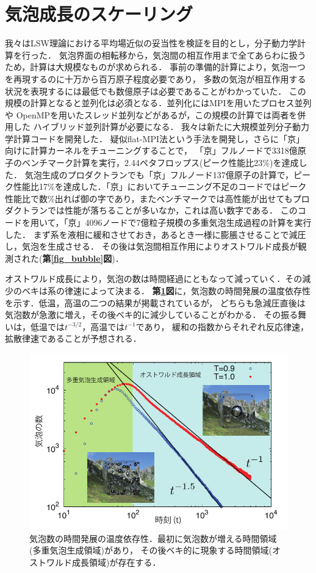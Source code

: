 \documentclass[topics,b5paper,papersize,twocolumn]{jsarticle}
\begin{document}
\section{気泡成長のスケーリング}

我々はLSW理論における平均場近似の妥当性を検証を目的とし，分子動力学計算を行った．
気泡界面の相転移から，気泡間の相互作用まで全てあらわに扱うため，計算は大規模なものが求められる．
事前の準備的計算により，気泡一つを再現するのに十万から百万原子程度必要であり，
多数の気泡が相互作用する状況を表現するには最低でも数億原子は必要であることがわかっていた．
この規模の計算となると並列化は必須となる．並列化にはMPIを用いたプロセス並列や
OpenMPを用いたスレッド並列などがあるが，この規模の計算では両者を併用した
ハイブリッド並列計算が必要になる．
我々は新たに大規模並列分子動力学計算コードを開発した\cite{mdacp,mdnote}．
疑似flat-MPI法という手法を開発し，さらに「京」向けに計算カーネルをチューニングすることで，
「京」フルノードで3318億原子のベンチマーク計算を実行，2.44ペタフロップス(ピーク性能比23\%)を達成した．
気泡生成のプロダクトランでも「京」フルノード137億原子の計算で，ピーク性能比17\%を達成した\cite{fx10full}．「京」においてチューニング不足のコードではピーク性能比で数\%出れば御の字であり，またベンチマークでは高性能が出せてもプロダクトランでは性能が落ちることが多いなか，これは高い数字である．
このコードを用いて，「京」4096ノードで7億粒子規模の多重気泡生成過程の計算を実行した\cite{Watanabe2014}．
まず系を液相に緩和させておき，あるとき一様に膨脹させることで減圧し，気泡を生成させる．
その後は気泡間相互作用によりオストワルド成長が観測された(\textbf{第\ref{fig_bubble}図})．

オストワルド成長により，気泡の数は時間経過にともなって減っていく．その減少のベキは系の律速によって決まる．
\textbf{第\ref{fig_result}図}に，気泡数の時間発展の温度依存性を示す．低温，高温の二つの結果が掲載されているが，
どちらも急減圧直後は気泡数が急激に増え，その後ベキ的に減少していることがわかる．
その振る舞いは，低温では$t^{-3/2}$，高温では$t^{-1}$であり，
緩和の指数からそれぞれ反応律速，拡散律速であることが予想される．

\begin{figure}[tb]
\centering
\includegraphics[width=0.9\linewidth]{result.pdf}
\caption{
気泡数の時間発展の温度依存性．最初に気泡数が増える時間領域(多重気泡生成領域)があり，
その後ベキ的に現象する時間領域(オストワルド成長領域)が存在する\cite{Watanabe2014}．
}\label{fig_result}
\end{figure}
\end{document}
